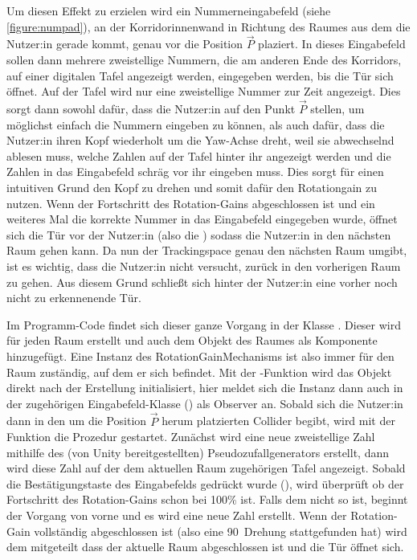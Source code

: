 Um diesen Effekt zu erzielen wird ein Nummerneingabefeld (siehe \autoref{figure:numpad}), an der Korridorinnenwand in Richtung des Raumes aus dem die Nutzer:in gerade kommt, genau vor die Position $\vec{P}$ plaziert. In dieses Eingabefeld sollen dann mehrere zweistellige Nummern, die am anderen Ende des Korridors, auf einer digitalen Tafel angezeigt werden, eingegeben werden, bis die Tür sich öffnet. Auf der Tafel wird nur eine zweistellige Nummer zur Zeit angezeigt.
Dies sorgt dann sowohl dafür, dass die Nutzer:in auf den Punkt $\vec{P}$ stellen, um möglichst einfach die Nummern eingeben zu können, als auch dafür, dass die Nutzer:in ihren Kopf wiederholt um die Yaw-Achse dreht, weil sie abwechselnd ablesen muss, welche Zahlen auf der Tafel hinter ihr angezeigt werden und die Zahlen in das Eingabefeld schräg vor ihr eingeben muss. Dies sorgt für einen intuitiven Grund den Kopf zu drehen und somit dafür den Rotationgain zu nutzen. Wenn der Fortschritt des Rotation-Gains abgeschlossen ist und ein weiteres Mal die korrekte Nummer in das Eingabefeld eingegeben wurde, öffnet sich die Tür vor der Nutzer:in (also die ) sodass die Nutzer:in in den nächsten Raum gehen kann. Da nun der Trackingspace genau den nächsten Raum umgibt, ist es wichtig, dass die Nutzer:in nicht versucht, zurück in den vorherigen Raum zu gehen. Aus diesem Grund schließt sich hinter der Nutzer:in eine vorher noch nicht zu erkennenende Tür.

Im Programm-Code findet sich dieser ganze Vorgang in der Klasse . Dieser wird für jeden Raum erstellt und auch dem Objekt des Raumes als Komponente hinzugefügt. Eine Instanz des RotationGainMechanisms ist also immer für den Raum zuständig, auf dem er sich befindet. Mit der -Funktion wird das Objekt direkt nach der Erstellung initialisiert, hier meldet sich die Instanz dann auch in der zugehörigen Eingabefeld-Klasse () als Observer an. Sobald sich die Nutzer:in dann in den um die Position $\vec{P}$ herum platzierten Collider begibt, wird mit der Funktion  die Prozedur gestartet. Zunächst wird eine neue zweistellige Zahl mithilfe des (von Unity bereitgestellten) Pseudozufallgenerators erstellt, dann wird diese Zahl auf der dem aktuellen Raum zugehörigen Tafel angezeigt. Sobald die Bestätigungstaste des Eingabefelds gedrückt wurde (\textquote{\#}), wird überprüft ob der Fortschritt des Rotation-Gains schon bei 100\% ist. Falls dem nicht so ist, beginnt der Vorgang von vorne und es wird eine neue Zahl erstellt. Wenn der Rotation-Gain vollständig abgeschlossen ist (also eine 90\textdegree\ Drehung stattgefunden hat) wird dem  mitgeteilt dass der aktuelle Raum abgeschlossen ist und die Tür öffnet sich.

